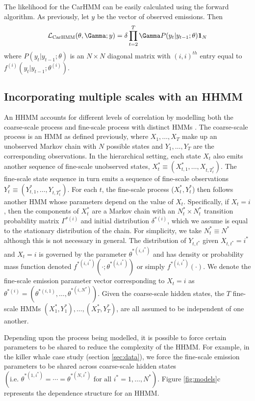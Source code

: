 The likelihood for the CarHMM can be easily calculated using the forward algorithm. As previously, let $y$ be the vector of observed emissions. Then
\begin{equation*}
    \calL_{\text{CarHMM}}(\theta,\Gamma;y) = \delta \prod_{t=2}^T \Gamma P(y_t|y_{t-1};\theta) \mathbf{1}_N
    \label{CarHMM_likelihood}
\end{equation*}
where
%
$P(y_t|y_{t-1};\theta)$ is an $N \times N$ diagonal matrix with $(i,i)^{th}$ entry equal to $f^{(i)}(y_t|y_{t-1}; \theta^{(i)})$.

\subsection{Incorporating multiple scales with an HHMM}

An HHMM accounts for different levels of correlation by modelling both the coarse-scale process and fine-scale process with distinct HMMs \citep{Barajas:2017,Adam:2019}. The coarse-scale process is an HMM as defined previously, where $X_1, \ldots, X_T$ make up an unobserved Markov chain with $N$ possible states and $Y_1,\ldots, Y_T$ are the corresponding observations.   
%
In the hierarchical setting, each state $X_t$ also emits another sequence of fine-scale unobserved states, $X_t^* \equiv (X_{t,1}^*,\ldots, X_{t,T_t^*})$. The fine-scale state sequence in turn emits a sequence of fine-scale observations $Y_t^* \equiv (Y_{t,1}^*,\ldots, Y_{t,T_t^*})$. For each $t$, the fine-scale process ($X_t^*, Y_t^*$) then follows another HMM whose parameters depend on the value of $X_t$. Specifically, if $X_t=i$, then the components of $X_t^*$ are a Markov chain with an $N^*_t \times N^*_t$ transition probability matrix $\Gamma^{*(i)}$ and initial distribution $\delta^{*(i)}$, which we assume is equal to the stationary distribution of the chain. For simplicity, we take $N_t^* \equiv N^*$ although this is not necessary in general. The distribution of $Y_{t,t^*}$ given $X_{t,t^*}=i^*$ and $X_t=i$ is governed by the parameter $\theta^{*(i,i^*)}$ and has density or probability mass function denoted $f^{*(i,i^*)}\left(\cdot; \theta^{*(i,i^*)}\right)$ or simply $f^{*(i,i^*)}(\cdot)$. We denote the fine-scale emission parameter vector corresponding to $X_t=i$ as $\theta^{*(i)}=\left(\theta^{*(i,1)}, \ldots, \theta^{*(i,N^*)}\right)$. Given the coarse-scale hidden states, the $T$ fine-scale HMMs $(X_1^*, Y_1^*), \ldots, (X_T^*, Y_T^*)$, are all assumed to be independent of one another.

Depending upon the process being modelled, it is possible to force certain parameters to be shared to reduce the complexity of the HHMM. For example, in the killer whale case study (section \ref{sec:data}), we force the fine-scale emission parameters to be shared across coarse-scale hidden states $\left( \text{i.e. } \theta^{*(1,i^*)} = \cdots = \theta^{*(N,i^*)} \text{ for all } i^* = 1, \ldots, N^* \right)$. Figure \ref{fig:models}c represents the dependence structure for an HHMM. 

